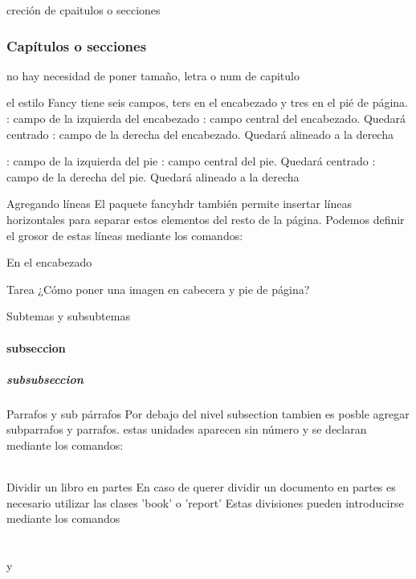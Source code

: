 \documentclass{article}
\begin{document}
creción de cpaitulos o secciones
\section{Capítulos o secciones}
no hay necesidad de poner tamaño, letra o num de capitulo

el estilo Fancy tiene seis campos, ters en el encabezado y tres en el pié de página.
\lhead{}: campo de la izquierda del encabezado
\chead{}: campo central del encabezado. Quedará centrado
\rhead{}: campo de la derecha del encabezado. Quedará alineado a la derecha 

\lfoot{}: campo de la izquierda del pie
\cfoot{}: campo central del pie. Quedará centrado
\rfoot{}: campo de la derecha del pie. Quedará alineado a la derecha 

Agregando líneas
El paquete fancyhdr también permite insertar líneas horizontales para separar estos elementos del resto de la página. Podemos definir el grosor de estas líneas mediante los comandos:
\renewcommand{\headrulewidth}{0.45pt}
\renewcommand{\footrulewidth}{1pt}

En el encabezado
\usepackage{fancyhdr} %
\pagestyle{fancy} %
\pagestyle{headings} %

\renewcommand{\headrulewidth}{0.4pt} %
\renewcommand{\footrulewidth}{0.4pt} %

Tarea
¿Cómo poner una imagen en cabecera y pie de página?

Subtemas y subsubtemas
\subsection{subseccion}
\subsubsection{subsubseccion}

Parrafos y sub párrafos
Por debajo del nivel subsection tambien es posble agregar subparrafos y parrafos. estas unidades aparecen sin número y se declaran mediante los comandos:
\paragraph{}
\subparagraph{}

Dividir un libro en partes
En caso de querer dividir un documento en partes es necesario utilizar las clases 'book' o 'report'
Estas divisiones pueden introducirse mediante los comandos \part{} y \chapter{}
\end{document}
